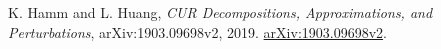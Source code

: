 K. Hamm and L. Huang,
\emph{CUR Decompositions, Approximations, and Perturbations},
arXiv:1903.09698v2, 2019.
\href{https://arxiv.org/abs/1903.09698v2}{arXiv:1903.09698v2}.
